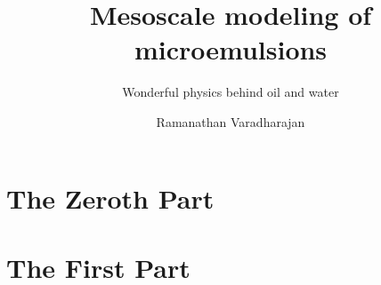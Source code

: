 \documentclass[a4paper,9pt]{memoir}
\title{Mesoscale modeling of microemulsions}
\subtitle{Wonderful physics behind oil and water}
\author{Ramanathan Varadharajan}
\begin{document}
    \frontmatter        %

    \mnfrontpage

    

    \cleartorecto
    \tableofcontents    %
    \cleartorecto
    \listoffigures      %
    \cleartorecto
    \listoftables       %

    \mainmatter         %

    
    
    \part{The Zeroth Part}
    
    
    \part{The First Part}

    
    

    \appendix           %
    \appendixpage       %

    
    

    \backmatter         %

    \printbibliography
    
\end{document}
